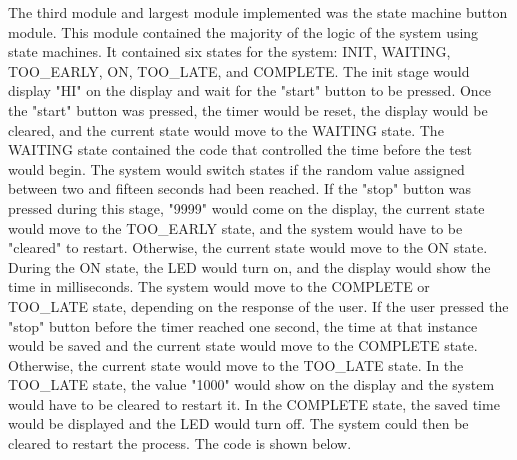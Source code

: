 \documentclass[11pt]{article}
\begin{document}
The third module and largest module implemented was the state machine button module. This module contained the majority of the logic of the system using state machines. It contained six states for the system: INIT, WAITING, TOO\_EARLY, ON, TOO\_LATE, and COMPLETE. The init stage would display "HI" on the display and wait for the "start" button to be pressed. Once the "start" button was pressed, the timer would be reset, the display would be cleared, and the current state would move to the WAITING state. The WAITING state contained the code that controlled the time before the test would begin. The system would switch states if the random value assigned between two and fifteen seconds had been reached. If the "stop" button was pressed during this stage, "9999" would come on the display, the current state would move to the TOO\_EARLY state, and the system would have to be "cleared" to restart. Otherwise, the current state would move to the ON state. During the ON state, the LED would turn on, and the display would show the time in milliseconds. The system would move to the COMPLETE or TOO\_LATE state, depending on the response of the user. If the user pressed the "stop" button before the timer reached one second, the time at that instance would be saved and the current state would move to the COMPLETE state. Otherwise, the current state would move to the TOO\_LATE state. In the TOO\_LATE state, the value "1000" would show on the display and the system would have to be cleared to restart it. In the COMPLETE state, the saved time would be displayed and the LED would turn off. The system could then be cleared to restart the process. The code is shown below. 
\end{document}
